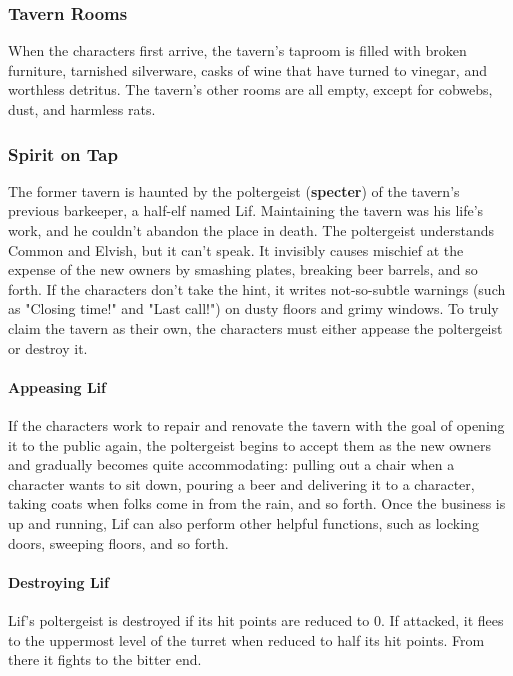 \documentclass[10pt,a4paper,twoside,twocolumn,openany,nodeprecatedcode]{dndbook}
\begin{document}
\subsubsection{Tavern Rooms}
When the characters first arrive, the tavern's taproom is filled with broken furniture, tarnished silverware, casks of wine that have turned to vinegar, and worthless detritus. The tavern's other rooms are all empty, except for cobwebs, dust, and harmless rats.
\subsubsection{Spirit on Tap}
The former tavern is haunted by the poltergeist (\textbf{specter}) of the tavern's previous barkeeper, a half-elf named Lif. Maintaining the tavern was his life's work, and he couldn't abandon the place in death.
The poltergeist understands Common and Elvish, but it can't speak. It invisibly causes mischief at the expense of the new owners by smashing plates, breaking beer barrels, and so forth. If the characters don't take the hint, it writes not-so-subtle warnings (such as "Closing time!" and "Last call!") on dusty floors and grimy windows. To truly claim the tavern as their own, the characters must either appease the poltergeist or destroy it.
\paragraph{Appeasing Lif}
If the characters work to repair and renovate the tavern with the goal of opening it to the public again, the poltergeist begins to accept them as the new owners and gradually becomes quite accommodating: pulling out a chair when a character wants to sit down, pouring a beer and delivering it to a character, taking coats when folks come in from the rain, and so forth. Once the business is up and running, Lif can also perform other helpful functions, such as locking doors, sweeping floors, and so forth.
\paragraph{Destroying Lif}
Lif's poltergeist is destroyed if its hit points are reduced to 0. If attacked, it flees to the uppermost level of the turret when reduced to half its hit points. From there it fights to the bitter end.
\end{document}
